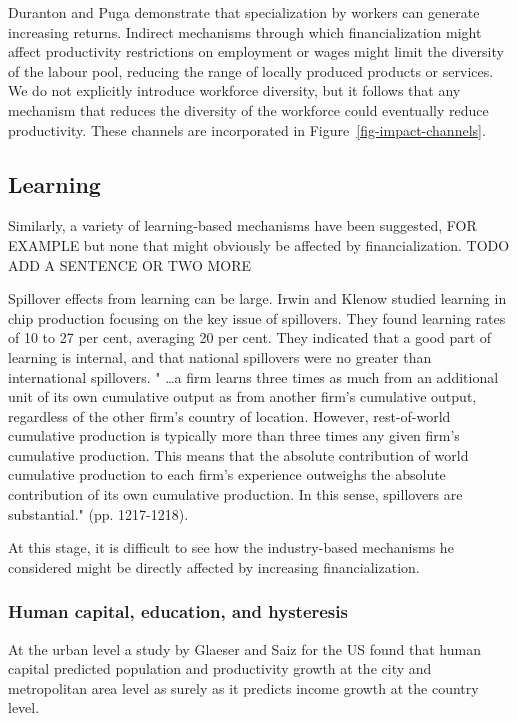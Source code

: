 Duranton and Puga demonstrate that specialization by workers can generate increasing returns. Indirect mechanisms through which financialization might affect productivity restrictions on employment or wages might limit the diversity of the labour pool, reducing the range of locally produced products or services.  We do not explicitly introduce workforce diversity, but it follows that any mechanism that reduces the diversity of the workforce could eventually reduce productivity. These channels are incorporated in Figure~\ref{fig-impact-channels}.
 
\subsection{Learning}
Similarly, a variety of learning-based mechanisms have been suggested, FOR EXAMPLE but none that might obviously be affected by financialization. TODO ADD A SENTENCE OR TWO MORE

Spillover effects from learning can be large. Irwin and Klenow  studied learning in chip production focusing  on the key issue of spillovers. They found learning rates of 10 to 27 per cent, averaging 20 per cent. They indicated that a good part of learning is internal, and that national spillovers were no greater than international spillovers. " \dots a firm learns three times as much from an additional unit of its own cumulative output as from another firm's cumulative output, regardless of the other firm's country of location. However, rest-of-world cumulative production is typically more than three times any given firm's cumulative production. This means that the absolute contribution of world cumulative production to each firm's experience outweighs the absolute contribution of its own cumulative production. In this sense, spillovers are substantial." (pp. 1217-1218).

At this stage, it is difficult to see how the industry-based mechanisms he considered might be directly affected by increasing financialization. 


\subsubsection{Human capital, education, and hysteresis}

At the urban level a study by Glaeser and Saiz \cite{glaeserRiseSkilledCity2003} for the US found that human capital predicted population and productivity growth at the city and metropolitan area level as surely as it predicts income growth at the country level. 

